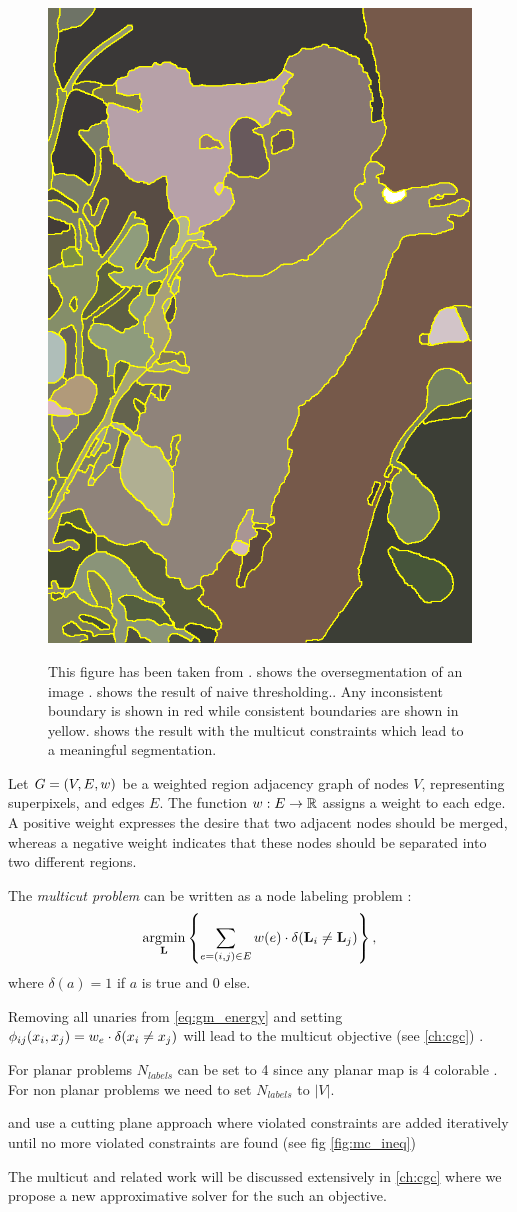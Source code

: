 \begin{figure}[h]
{{            \protect\includegraphics[width=.075\linewidth]{fig/andres/2.png} 
        }%
    }%
    \caption[Naive thresholding vs. multicuts]{
    This figure has been taken from \cite{andres_2011_iccv} .
     shows the oversegmentation of 
    an image .
     shows the result of naive thresholding..
    Any inconsistent boundary is shown in red while consistent
    boundaries are shown in yellow. 
     shows the result with the multicut
    constraints which lead to a meaningful segmentation.
    } \label{fig:naive_thresholding}
\end{figure}



Let $G=(V,E, w)$ be a weighted region adjacency graph of
nodes $V$, representing superpixels,
and edges $E$.
%
The function $w : E \rightarrow \mathbb{R}$ assigns a weight to each edge.
A positive weight expresses the desire that two adjacent nodes should
be merged, whereas a negative weight indicates
that these nodes should be separated into two different regions.


The \emph{multicut problem} can be written as a node labeling problem
\cite{bagon_2011_arxiv}:
%
\begin{align}
\operatorname*{\arg\!\min}_{\mathbf{L}}
    \left\{
    \sum_{ e=(i,j) \in E}
        w(e)
        \cdot \delta( \mathbf{L}_i \neq \mathbf{L}_j )
    \right\},
    \label{eq:multicut_primal_a}
\end{align}
%
where $\delta(a) = 1$ if $a$ is true and $0$ else.


Removing all unaries from \cref{eq:gm_energy} and 
setting $\phi_{ij}(x_i,x_j) =   w_e \cdot \delta( x_i \neq x_j )$ 
will lead to the multicut objective (see \cref{ch:cgc}) .

For planar problems  $N_{labels}$ can be set to 4 since any planar map is 4 colorable \citep{appel_1977_4color}.
For non planar problems we need to set $N_{labels}$ to $|V|$.


\citet{andres_2011_iccv} and \citet{kappes_2011_emmcvpr} use a
cutting plane approach where violated constraints are added
iteratively until no more violated constraints are found (see fig \cref{fig:mc_ineq})

The multicut and related work will be discussed extensively in \cref{ch:cgc} where
we propose a new approximative solver for the such an objective.


